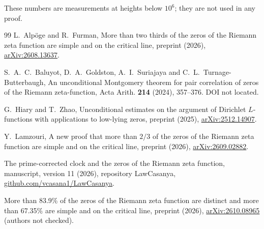 \documentclass[11pt,reqno]{amsart}
\numberwithin{equation}{section}
\theoremstyle{plain}
\theoremstyle{definition}
\theoremstyle{remark}
\begin{document}
These numbers are measurements at heights below $10^6$; they are not used in any proof.

\begin{thebibliography}{99}
L.~Alp\"oge and R.~Furman, More than two thirds of the zeros of the Riemann zeta function are simple and on the critical line, preprint (2026), \href{https://arxiv.org/abs/2608.13637}{arXiv:2608.13637}.

S.~A.~C.~Baluyot, D.~A.~Goldston, A.~I.~Suriajaya and C.~L.~Turnage-Butterbaugh, An unconditional Montgomery theorem for pair correlation of zeros of the Riemann zeta-function, Acta Arith. \textbf{214} (2024), 357--376. DOI not located.

G.~Hiary and T.~Zhao, Unconditional estimates on the argument of Dirichlet $L$-functions with applications to low-lying zeros, preprint (2025), \href{https://arxiv.org/abs/2512.14907}{arXiv:2512.14907}.

Y.~Lamzouri, A new proof that more than $2/3$ of the zeros of the Riemann zeta function are simple and on the critical line, preprint (2026), \href{https://arxiv.org/abs/2609.02882}{arXiv:2609.02882}.

The prime-corrected clock and the zeros of the Riemann zeta function, manuscript, version 11 (2026), repository LawCasanya, \href{https://github.com/vcasana1/LawCasanya}{github.com/vcasana1/LawCasanya}.

More than 83.9\% of the zeros of the Riemann zeta function are distinct and more than 67.35\% are simple and on the critical line, preprint (2026), \href{https://arxiv.org/abs/2610.08965}{arXiv:2610.08965} (authors not checked).
\end{thebibliography}
\end{document}
